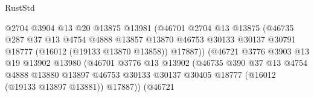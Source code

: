 \begin{lexlean}{RustStd}
\begin{coremodule}
                                        @2704
                                        @3904
                                        @13
                                        @20
                                        @13875
                                        @13981
                                        (@46701
                                          @2704
                                          @13
                                          @13875
                                          (@46735
                                            @287
                                            @37
                                            @13
                                            @4754
                                            @4888
                                            @13857
                                            @13870
                                            @46753
                                            @30133
                                            @30137
                                            @30791
                                            @18777
                                            (@16012 (@19133 @13870 @13858))
                                            @17887))
                                        (@46721
                                          @3776
                                          @3903
                                          @13
                                          @19
                                          @13902
                                          @13980
                                          (@46701
                                            @3776
                                            @13
                                            @13902
                                            (@46735
                                              @390
                                              @37
                                              @13
                                              @4754
                                              @4888
                                              @13880
                                              @13897
                                              @46753
                                              @30133
                                              @30137
                                              @30405
                                              @18777
                                              (@16012 (@19133 @13897 @13881))
                                              @17887))
                                          (@46721

\end{coremodule}
\end{lexlean}
